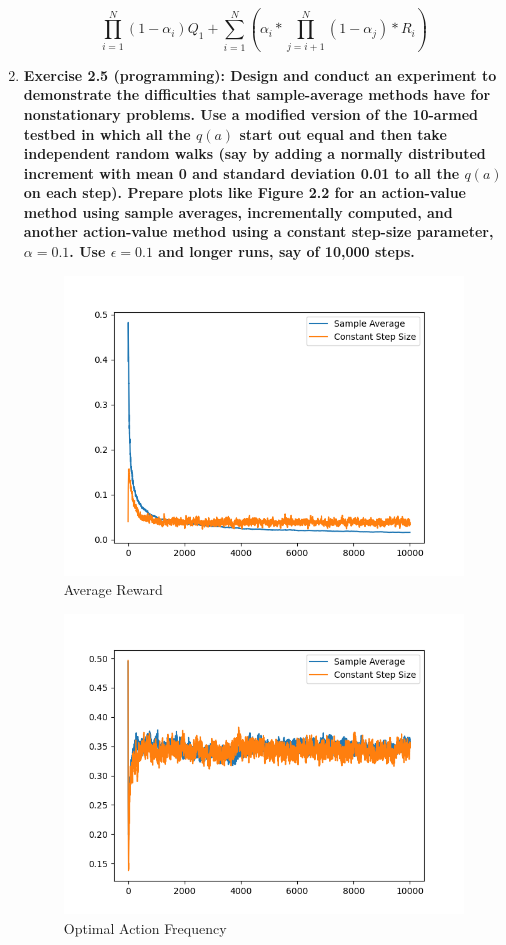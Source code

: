 \documentclass[11pt]{article}
\begin{document}
\begin{enumerate}
		$$\prod_{i=1}^N(1-\alpha_i)Q_1 + \sum_{i=1}^N(\alpha_i * \prod_{j=i+1}^N (1 - \alpha_j) * R_i)$$
		
		\item \textbf{Exercise 2.5 (programming): Design and conduct an experiment to demonstrate the difficulties that sample-average methods have for nonstationary problems. Use
		a modified version of the 10-armed testbed in which all the $q(a)$ start out equal and then take independent random walks (say by adding a normally distributed increment
		with mean 0 and standard deviation 0.01 to all the $q(a)$ on each step). Prepare plots like Figure 2.2 for an action-value method using sample averages, incrementally
		computed, and another action-value method using a constant step-size parameter, $\alpha=0.1$. Use $\epsilon=0.1$ and longer runs, say of 10,000 steps.}
		
		\begin{figure}[h]
			\caption{Average Reward}
			\includegraphics[scale=.5]{average_rewards}
		\end{figure}
		
		\begin{figure}[h]
			\caption{Optimal Action Frequency}
			\includegraphics[scale=.5]{optimal_action}
		\end{figure}
		

\end{enumerate}
\end{document}
